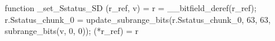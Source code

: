 function _set_Sstatus_SD (r_ref, v) = {
    r = __bitfield_deref(r_ref);
    r.Sstatus_chunk_0 = update_subrange_bits(r.Sstatus_chunk_0, 63, 63, subrange_bits(v, 0, 0));
    (*r_ref) = r
}
